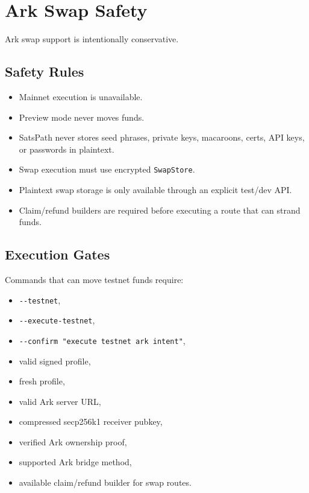 \documentclass[
]{article}
\author{}
\date{}
\providecommand{\tightlist}{%
  \setlength{\itemsep}{0pt}\setlength{\parskip}{0pt}}
\begin{document}
\hypertarget{ark-swap-safety}{%
\section{Ark Swap Safety}\label{ark-swap-safety}}

Ark swap support is intentionally conservative.

\hypertarget{safety-rules}{%
\subsection{Safety Rules}\label{safety-rules}}

\begin{itemize}
\tightlist
\item
  Mainnet execution is unavailable.
\item
  Preview mode never moves funds.
\item
  SatsPath never stores seed phrases, private keys, macaroons, certs,
  API keys, or passwords in plaintext.
\item
  Swap execution must use encrypted \texttt{SwapStore}.
\item
  Plaintext swap storage is only available through an explicit test/dev
  API.
\item
  Claim/refund builders are required before executing a route that can
  strand funds.
\end{itemize}

\hypertarget{execution-gates}{%
\subsection{Execution Gates}\label{execution-gates}}

Commands that can move testnet funds require:

\begin{itemize}
\tightlist
\item
  \texttt{-\/-testnet},
\item
  \texttt{-\/-execute-testnet},
\item
  \texttt{-\/-confirm\ "execute\ testnet\ ark\ intent"},
\item
  valid signed profile,
\item
  fresh profile,
\item
  valid Ark server URL,
\item
  compressed secp256k1 receiver pubkey,
\item
  verified Ark ownership proof,
\item
  supported Ark bridge method,
\item
  available claim/refund builder for swap routes.
\end{itemize}
\end{document}
